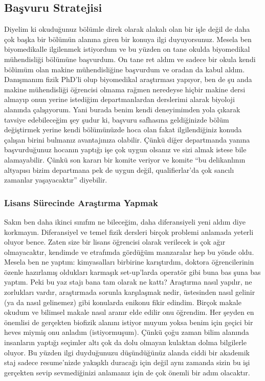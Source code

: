 \documentclass[12pt]{article}
\begin{document}
\subsection{Başvuru Stratejisi}
Diyelim ki okuduğunuz bölümle direk olarak alakalı olan bir işle değil de daha çok başka bir bölümün alanına giren bir konuya ilgi duyuyorsunuz. Mesela ben biyomedikalle ilgilenmek istiyordum ve bu yüzden on tane okulda biyomedikal mühendisliği bölümüne başvurdum. On tane ret aldım ve sadece bir okula kendi bölümüm olan makine mühendisliğine başvurdum ve oradan da kabul aldım. Danışmanım fizik PhD’li olup biyomedikal araştırması yapıyor, ben de şu anda makine mühendisliği öğrencisi olmama rağmen neredeyse hiçbir makine dersi almayıp onun yerine istediğim departmanlardan derslerimi alarak biyoloji alanında çalışıyorum. Yani burada benim kendi deneyimimden yola çıkarak tavsiye edebileceğim şey şudur ki, başvuru safhasına geldiğinizde bölüm değiştirmek yerine kendi bölümünüzde hoca olan fakat ilgilendiğiniz konuda çalışan birini bulmanız avantajınıza olabilir. Çünkü diğer departmanda yanına başvurduğunuz hocanın yaptığı işe çok uygun olsanız ve sizi almak istese bile alamayabilir. Çünkü son kararı bir komite veriyor ve komite ``bu delikanlının altyapısı bizim departmana pek de uygun değil, qualifierlar’da çok sancılı zamanlar yaşayacaktır'' diyebilir.

\subsubsection{Lisans Sürecinde Araştırma Yapmak}
Sakın ben daha ikinci sınıfım ne bileceğim, daha diferansiyeli yeni aldım diye korkmayın. Diferansiyel ve temel fizik dersleri birçok problemi anlamada yeterli oluyor bence. Zaten size bir lisans öğrencisi olarak verilecek is çok ağır olmayacaktır, kendimde ve etrafımda gördüğüm manzaralar hep bu yönde oldu. Mesela ben ne yaptım: kimyasalları birbirine karıştırdım, doktora öğrencilerinin özenle hazırlamış oldukları karmaşık set-up’larda operatör gibi buna bas şuna bas yaptım. Peki bu yaz stajı bana tam olarak ne kattı? Araştırma nasıl yapılır, ne zorlukları vardır, araştırmada sorunla karşılaşmak nedir, üstesinden nasıl gelinir (ya da nasıl gelinemez) gibi konularda enikonu fikir edindim. Birçok makale okudum ve bilimsel makale nasıl aranır elde edilir onu öğrendim. Her şeyden en önemlisi de gerçekten biofizik alanını istiyor muyum yoksa benim için geçici bir heves miymiş onu anladım (istiyormuşum). Çünkü çoğu zaman bilim alanında insanların yaptığı seçimler altı çok da dolu olmayan kulaktan dolma bilgilerle oluyor. Bu yüzden ilgi duyduğunuzu düşündüğünüz alanda ciddi bir akademik staj sadece resume’nizde yakışıklı duracağı için değil aynı zamanda sizin bu işi gerçekten sevip sevmediğinizi anlamanız için de çok önemli bir adım olacaktır.
\end{document}
